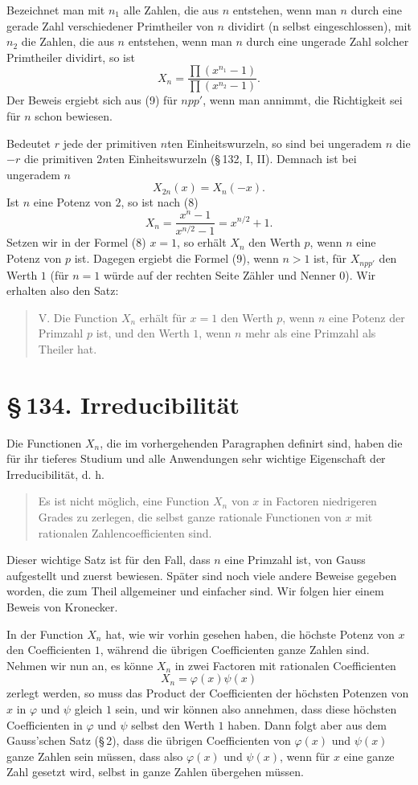 \documentclass[11pt]{article}
\providecommand{\sect}[2]{\section*{\S\,#1. #2}}
\begin{document}
Bezeichnet man mit $n_1$ alle Zahlen, die aus $n$ entstehen, wenn man $n$ durch eine gerade Zahl verschiedener Primtheiler von $n$ dividirt (n selbst eingeschlossen), mit $n_2$ die Zahlen, die aus $n$ entstehen, wenn man $n$ durch eine ungerade Zahl solcher Primtheiler dividirt, so ist
\[
\tag{10}       X_n=\frac{\prod(x^{n_1}-1)}{\prod(x^{n_2}-1)}.
\]
Der Beweis ergiebt sich aus (9) für $npp'$, wenn man annimmt, die Richtigkeit sei für $n$ schon bewiesen.

Bedeutet $r$ jede der primitiven $n$ten Einheitswurzeln, so sind bei ungeradem $n$ die $-r$ die primitiven $2n$ten Einheitswurzeln (\S\,132, I, II). Demnach ist bei ungeradem $n$
\[
\tag{11}       X_{2n}(x)=X_n(-x).
\]
Ist $n$ eine Potenz von $2$, so ist nach (8)
\[
\tag{12}       X_n=\frac{x^n-1}{x^{n/2}-1}=x^{n/2}+1.
\]
Setzen wir in der Formel (8) $x=1$, so erhält $X_n$ den Werth $p$, wenn $n$ eine Potenz von $p$ ist. Dagegen ergiebt die Formel (9), wenn $n>1$ ist, für $X_{npp'}$ den Werth $1$ (für $n=1$ würde auf der rechten Seite Zähler und Nenner $0$). Wir erhalten also den Satz:
\begin{quote}
V. Die Function $X_n$ erhält für $x=1$ den Werth $p$, wenn $n$ eine Potenz der Primzahl $p$ ist, und den Werth $1$, wenn $n$ mehr als eine Primzahl als Theiler hat.
\end{quote}

\sect{134}{Irreducibilität}

Die Functionen $X_n$, die im vorhergehenden Paragraphen definirt sind, haben die für ihr tieferes Studium und alle Anwendungen sehr wichtige Eigenschaft der Irreducibilität, d. h.
\begin{quote}
Es ist nicht möglich, eine Function $X_n$ von $x$ in Factoren niedrigeren Grades zu zerlegen, die selbst ganze rationale Functionen von $x$ mit rationalen Zahlencoefficienten sind.
\end{quote}
Dieser wichtige Satz ist für den Fall, dass $n$ eine Primzahl ist, von Gauss aufgestellt und zuerst bewiesen. Später sind noch viele andere Beweise gegeben worden, die zum Theil allgemeiner und einfacher sind. Wir folgen hier einem Beweis von Kronecker.

In der Function $X_n$ hat, wie wir vorhin gesehen haben, die höchste Potenz von $x$ den Coefficienten $1$, während die übrigen Coefficienten ganze Zahlen sind. Nehmen wir nun an, es könne $X_n$ in zwei Factoren mit rationalen Coefficienten
\[
\tag{1}        X_n=\varphi(x)\psi(x)
\]
zerlegt werden, so muss das Product der Coefficienten der höchsten Potenzen von $x$ in $\varphi$ und $\psi$ gleich $1$ sein, und wir können also annehmen, dass diese höchsten Coefficienten in $\varphi$ und $\psi$ selbst den Werth $1$ haben. Dann folgt aber aus dem Gauss'schen Satz (\S\,2), dass die übrigen Coefficienten von $\varphi(x)$ und $\psi(x)$ ganze Zahlen sein müssen, dass also $\varphi(x)$ und $\psi(x)$, wenn für $x$ eine ganze Zahl gesetzt wird, selbst in ganze Zahlen übergehen müssen.
\end{document}
